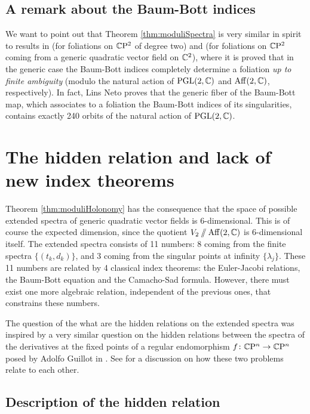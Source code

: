 \documentclass[phd,tocprelim]{cornell}
\begin{document}
\subsection{A remark about the Baum-Bott indices}

We want to point out that Theorem \ref{thm:moduliSpectra} is very similar in spirit to results in \cite{LinsNeto2012} (for foliations on $\CP^2$ of degree two) and \cite{IlyashenkoMoldavskis2011} (for foliations on $\CP^2$ coming from a generic quadratic vector field on $\C^2$), where it is proved that in the generic case the Baum-Bott indices completely determine a foliation \textit{up to finite ambiguity} (modulo the natural action of $\PGL{2}{\C}$ and $\Aff{2}{\C}$, respectively). In fact, Lins Neto proves that the generic fiber of the Baum-Bott map, which associates to a foliation the Baum-Bott indices of its singularities, contains exactly 240 orbits of the natural action of $\PGL{2}{\C}$.



\section{The hidden relation and lack of new index theorems}

Theorem \ref{thm:moduliHolonomy} has the consequence that the space of possible extended spectra of generic quadratic vector fields is 6-dimensional. This is of course the expected dimension, since the quotient $V_2\sslash\Aff{2}{\C}$ is 6-dimensional itself. The extended spectra consists of 11 numbers: 8 coming from the finite spectra $\{(t_k,d_k)\}$, and 3 coming from the singular points at infinity $\{\lambda_j\}$. These 11 numbers are related by 4 classical index theorems: the Euler-Jacobi relations, the Baum-Bott equation and the Camacho-Sad formula. However, there must exist one more algebraic relation, independent of the previous ones, that constrains these numbers.

\begin{remark}
 The question of the what are the hidden relations on the extended spectra was inspired by a very similar question on the hidden relations between the spectra of the derivatives at the fixed points of a regular endomorphism $f\colon\P^n\to\P^n$ posed by Adolfo Guillot in \cite{Guillot2004}. See \cite{WoodsHole} for a discussion on how these two problems relate to each other.
\end{remark}



\subsection{Description of the hidden relation}\label{sec:descriptionHiddenRelation}
\end{document}
